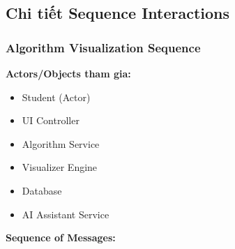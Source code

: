 \subsection{Chi tiết Sequence Interactions}

\subsubsection{Algorithm Visualization Sequence}

\textbf{Actors/Objects tham gia:}
\begin{itemize}
    \item Student (Actor)
    \item UI Controller
    \item Algorithm Service
    \item Visualizer Engine
    \item Database
    \item AI Assistant Service
\end{itemize}

\textbf{Sequence of Messages:}

